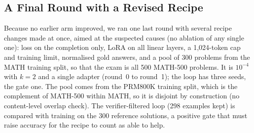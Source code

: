 \documentclass[runningheads]{llncs}
\begin{document}
\subsection{A Final Round with a Revised Recipe}
\label{sec:final}
Because no earlier arm improved, we ran one last round with several recipe changes made at once,
aimed at the suspected causes (no ablation of any single one): loss on the completion only, LoRA on all linear layers,
a 1,024-token cap and training limit, normalised gold answers, and a pool of
300 problems from the MATH training split, so that the exam is all 500
MATH-500 problems. It is $10^{-4}$ with $k=2$ and a single adapter (round~0 to round~1); the loop has three seeds, the gate one. The pool comes from the PRM800K training split, which is the complement of MATH-500 within MATH, so it is disjoint by construction (no content-level overlap check). The
verifier-filtered loop (298 examples kept) is compared with training on the 300
reference solutions, a positive gate that must raise accuracy for the recipe to
count as able to help. 

\begin{table}[!htb]
\caption{Final round, MATH-500 (500 exam problems, $k=2$, $10^{-4}$).
Change from each run's own untrained round~0 to round 1 in points (round-0 pass@1 is
$49.2$, $46.8$, $48.2$ at seeds 1--3, from sampling), with 95\% paired
problem-level bootstrap intervals that omit training-seed variance. The gold arm has one seed.}
\label{tab:final}
\centering
{}
\end{table}
\end{document}
